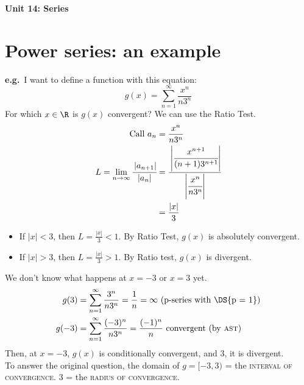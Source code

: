 

\usepackage{blindtext}
\setcounter{tocdepth}{4}
\setcounter{secnumdepth}{4}


\usepackage{subfiles}

\sectionfont{\color{blue}\selectfont}
\subsectionfont{\color{green}\selectfont}

\newcommand{\eg}{\textbf{e.g.}~}
\newcommand{\abs}[1]{\left\lvert #1 \right\rvert}
\newcommand\Ccancel[2][black]{\renewcommand\CancelColor{\color{#1}}\cancel{#2}}


\newtheorem{theorem}{Theorem}[section]
\newtheorem*{theorem*}{Theorem}
\newtheorem{definition}{Definition}[section]
{\LARGE \textbf{Unit 14: Series}}
\thispagestyle{empty}
\tableofcontents

\newpage
\clearpage
\setcounter{page}{1}
\section{Power series: an example}
\eg I want to define a function with this equation: \[g(x) = \sum_{n = 1}^{\infty} \frac{x^n}{n3^n}\]
For which \(x \in \R\) is \(g(x)\) convergent? We can use the Ratio Test.
\begin{align*}
    \text{Call } a_n                                       & = \frac{x^n}{n3^n}                                                      \\
    L = \lim_{n\to\infty} \cfrac{\abs{a_{n+1}}}{\abs{a_n}} & = \cfrac{\abs{\cfrac{x^{n+1}}{(n+1) 3^{n+1}}}}{\abs{\cfrac{x^n}{n3^n}}} \\
                                                           & = \frac{\abs{x}}{3}
\end{align*}
\begin{itemize}
    \item If \(\abs{x} < 3\), then \(L = \frac{\abs{x}}{3} < 1\). By Ratio Test, \(g(x)\) is absolutely convergent.
    \item If \(\abs{x} > 3\), then \(L = \frac{\abs{x}}{3} > 1\). By Ratio test, \(g(x)\) is divergent.
\end{itemize}
We don't know what happens at \(x = -3\) or \(x = 3\) yet. \\
\begin{align*}
    g(3)  & = \sum_{n = 1}^{\infty} \frac{3^n}{n3^n} = \frac{1}{n}  = \infty \text{ (p-series with \DS{p = 1})} \\
    g(-3) & = \sum_{n = 1}^{\infty} \frac{(-3)^n}{n3^n} = \frac{(-1)^n}{n} \text{ convergent (by \textsc{ast})} \\
\end{align*}
Then, at \(x = -3\), \(g(x)\) is conditionally convergent, and \(3\), it is divergent. \\
To answer the original question, the domain of \(g = [-3, 3)\) = the \textsc{interval of convergence}. \(3\) = the \textsc{radius of convergence}.
\newpage



